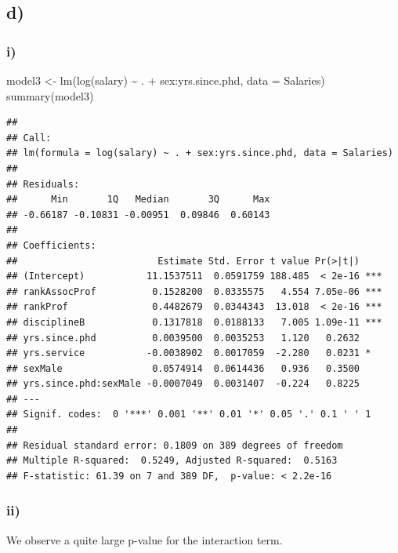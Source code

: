 \documentclass[
]{article}
\newenvironment{Shaded}{\begin{snugshade}}{\end{snugshade}}
\newcommand{\AttributeTok}[1]{\textcolor[rgb]{0.77,0.63,0.00}{#1}}
\newcommand{\FunctionTok}[1]{\textcolor[rgb]{0.00,0.00,0.00}{#1}}
\newcommand{\NormalTok}[1]{#1}
\newcommand{\OtherTok}[1]{\textcolor[rgb]{0.56,0.35,0.01}{#1}}
\newcommand{\SpecialCharTok}[1]{\textcolor[rgb]{0.00,0.00,0.00}{#1}}
\begin{document}
\hypertarget{d-1}{%
\subsection{d)}\label{d-1}}

\hypertarget{i-1}{%
\subsubsection{i)}\label{i-1}}

\begin{Shaded}
\begin{Highlighting}[]
\NormalTok{model3 }\OtherTok{\textless{}{-}} \FunctionTok{lm}\NormalTok{(}\FunctionTok{log}\NormalTok{(salary) }\SpecialCharTok{\textasciitilde{}}\NormalTok{ . }\SpecialCharTok{+}\NormalTok{ sex}\SpecialCharTok{:}\NormalTok{yrs.since.phd, }\AttributeTok{data =}\NormalTok{ Salaries)}
\FunctionTok{summary}\NormalTok{(model3)}
\end{Highlighting}
\end{Shaded}

\begin{verbatim}
## 
## Call:
## lm(formula = log(salary) ~ . + sex:yrs.since.phd, data = Salaries)
## 
## Residuals:
##      Min       1Q   Median       3Q      Max 
## -0.66187 -0.10831 -0.00951  0.09846  0.60143 
## 
## Coefficients:
##                         Estimate Std. Error t value Pr(>|t|)    
## (Intercept)           11.1537511  0.0591759 188.485  < 2e-16 ***
## rankAssocProf          0.1528200  0.0335575   4.554 7.05e-06 ***
## rankProf               0.4482679  0.0344343  13.018  < 2e-16 ***
## disciplineB            0.1317818  0.0188133   7.005 1.09e-11 ***
## yrs.since.phd          0.0039500  0.0035253   1.120   0.2632    
## yrs.service           -0.0038902  0.0017059  -2.280   0.0231 *  
## sexMale                0.0574914  0.0614436   0.936   0.3500    
## yrs.since.phd:sexMale -0.0007049  0.0031407  -0.224   0.8225    
## ---
## Signif. codes:  0 '***' 0.001 '**' 0.01 '*' 0.05 '.' 0.1 ' ' 1
## 
## Residual standard error: 0.1809 on 389 degrees of freedom
## Multiple R-squared:  0.5249, Adjusted R-squared:  0.5163 
## F-statistic: 61.39 on 7 and 389 DF,  p-value: < 2.2e-16
\end{verbatim}

\hypertarget{ii-1}{%
\subsubsection{ii)}\label{ii-1}}

We observe a quite large p-value for the interaction term.
\end{document}
